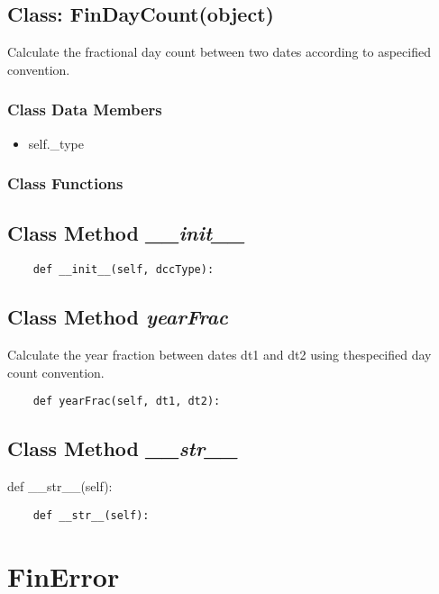 \documentclass[twoside,11pt]{book}
\begin{document}
\subsection{Class: FinDayCount(object)}
Calculate the fractional day count between two dates according to aspecified convention. 

\subsubsection{Class Data Members}
\begin{itemize}
\item{self.\_type}
\end{itemize}

\subsubsection{Class Functions}

\subsection{Class Method {\it \_\_init\_\_}}


\begin{lstlisting}
    def __init__(self, dccType):
\end{lstlisting}

\subsection{Class Method {\it yearFrac}}
Calculate the year fraction between dates dt1 and dt2 using thespecified day count convention. 

\begin{lstlisting}
    def yearFrac(self, dt1, dt2):
\end{lstlisting}

\subsection{Class Method {\it \_\_str\_\_}}
def \_\_str\_\_(self):

\begin{lstlisting}
    def __str__(self):
\end{lstlisting}

\newpage
\section{FinError}
\end{document}
